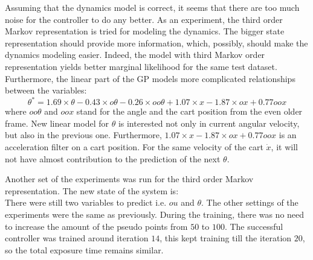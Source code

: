 \noindent Assuming that the dynamics model is correct, it seems that there are too much noise for the controller to do any better. As an experiment, the third order Markov representation is tried for modeling the dynamics. The bigger state representation should provide more information, which, possibly, should make the dynamics modeling easier. Indeed, the model with third Markov order representation yields better marginal likelihood for the same test dataset. Furthermore, the linear part of the GP models more complicated relationships between the variables:
\begin{equation}
\theta^{*} = 1.69 \times \theta - 0.43 \times o \theta -0.26 \times oo\theta + 1.07 \times x - 1.87 \times ox + 0.77 oox
\end{equation}
where $oo\theta$ and $oox$ stand for the angle and the cart position from the even older frame. New linear model for $\theta$ is interested not only in current angular velocity, but also in the previous one. Furthermore, $1.07 \times x - 1.87 \times ox + 0.77 oox$ is an acceleration filter on a cart position. For the same velocity of the cart $\dot{x}$, it will not have almost contribution  to the prediction of the next $\theta$. 

\noindent Another set of the experiments was run for the third order Markov representation. The new state of the system is:
\begin{equation}
[ooou, oox, oo\theta, oou, ox, o\theta, ou, x, \theta, u] \nonumber
\end{equation}
There were still two variables to predict i.e. $ou$ and $\theta$. The other settings of the experiments were the same as previously. During the training, there was no need to increase the amount of the pseudo points from $50$ to $100$. The successful controller was trained around iteration $14$, this kept training till the iteration $20$, so the total exposure time remains similar. 

